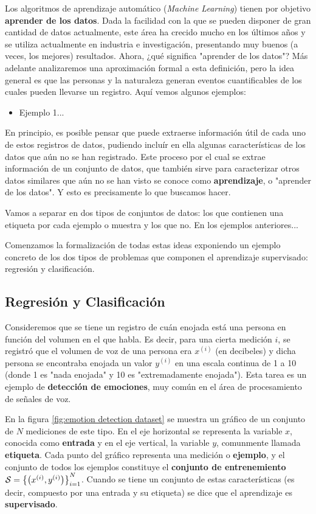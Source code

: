 Los algoritmos de aprendizaje automático (\textit{Machine Learning}) tienen por objetivo \textbf{aprender de los datos}. Dada la facilidad con la que se pueden disponer de gran cantidad de datos actualmente, este área ha crecido mucho en los últimos años y se utiliza actualmente en industria e investigación, presentando muy buenos (a veces, los mejores) resultados. Ahora, ¿qué significa "aprender de los datos"? Más adelante analizaremos una aproximación formal a esta definición, pero la idea general es que las personas y la naturaleza generan eventos cuantificables de los cuales pueden llevarse un registro. Aquí vemos algunos ejemplos:
\begin{itemize}
\item Ejemplo 1...
\end{itemize}

En principio, es posible pensar que puede extraerse información útil de cada uno de estos registros de datos, pudiendo incluír en ella algunas características de los datos que aún no se han registrado. Este proceso por el cual se extrae información de un conjunto de datos, que también sirve para caracterizar otros datos similares que aún no se han visto se conoce como \textbf{aprendizaje}, o "aprender de los datos". Y esto es precisamente lo que buscamos hacer.

Vamos a separar en dos tipos de conjuntos de datos: los que contienen una etiqueta por cada ejemplo o muestra y los que no. En los ejemplos anteriores...

Comenzamos la formalización de todas estas ideas exponiendo un ejemplo concreto de los dos tipos de problemas que componen el aprendizaje supervisado: regresión y clasificación.

\subsection{Regresión y Clasificación}

Consideremos que se tiene un registro de cuán enojada está una persona en función del volumen en el que habla. Es decir, para una cierta medición $i$, se registró que el volumen de voz de una persona era $x^{(i)}$ (en decibeles) y dicha persona se encontraba enojada un valor $y^{(i)}$ en una escala continua de 1 a 10 (donde 1 es "nada enojada" y 10 es "extremadamente enojada"). Esta tarea es un ejemplo de \textbf{detección de emociones}, muy común en el área de procesamiento de señales de voz.

En la figura \ref{fig:emotion detection dataset} se muestra un gráfico de un conjunto de $N$ mediciones de este tipo. En el eje horizontal se representa la variable $x$, conocida como \textbf{entrada} y en el eje vertical, la variable $y$, comunmente llamada \textbf{etiqueta}. Cada punto del gráfico representa una medición o \textbf{ejemplo}, y el conjunto de todos los ejemplos constituye el \textbf{conjunto de entrenemiento} $\mathcal{S} = {\left\lbrace \left( {x}^{(i)},{y}^{(i)} \right) \right\rbrace}_{i=1}^N$. Cuando se tiene un conjunto de estas características (es decir, compuesto por una entrada y su etiqueta) se dice que el aprendizaje es \textbf{supervisado}.

